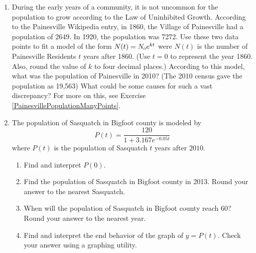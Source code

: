 \begin{enumerate}
\item  \label{PainesvillePopulationTwoPoint} During the early years of a community, it is not uncommon for the population to grow according to the Law of Uninhibited Growth.  According to the Painesville Wikipedia entry, in 1860, the Village of Painesville had a population of 2649.  In 1920, the population was 7272.  Use these two data points to fit a model of the form $N(t) = N_{\text{\tiny $0$}} e^{kt}$ were $N(t)$ is the number of Painesville Residents $t$ years after 1860.  (Use $t = 0$ to represent the year 1860.  Also, round the value of $k$ to four decimal places.)  According to this model, what was the population of Painesville in 2010?  (The 2010 census gave the population as 19,563) What could be some causes for such a vast discrepancy?  For more on this, see Exercise \ref{PainesvillePopulationManyPoints}.

\item  The population of Sasquatch in Bigfoot county is modeled by \[P(t) = \dfrac{120}{1 + 3.167e^{-0.05t}}\] where $P(t)$ is the population of Sasquatch $t$ years after $2010$.

\begin{enumerate}

\item  Find and interpret $P(0)$.

\item  Find the population of Sasquatch in Bigfoot county in 2013.  Round your answer to the nearest Sasquatch.

\item  When will the population of Sasquatch in Bigfoot county reach 60?  Round your answer to the nearest year.

\item  Find and interpret the end behavior of the graph of $y = P(t)$.  Check your answer using a graphing utility. 

\end{enumerate}

\setcounter{HW}{\value{enumi}}
\end{enumerate}


